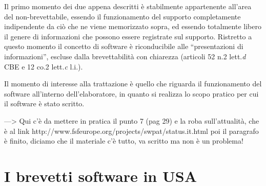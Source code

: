 Il primo momento dei due appena descritti è stabilmente appartenente all'area del non-brevettabile, essendo il funzionamento del supporto completamente indipendente da ciò che ne viene memorizzato sopra, ed essendo totalmente libero il genere di informazioni che possono essere registrate sul supporto. Ristretto a questo momento il concetto di software è riconducibile alle ``presentazioni di informazioni'', escluse dalla brevettabilità con chiarezza (articoli 52 n.2 lett.\textit{d} CBE e 12 co.2 lett.\textit{c} l.i.).

Il momento di interesse alla trattazione è quello che riguarda il funzionamento del software all'interno dell'elaboratore, in quanto si realizza lo scopo pratico per cui il software è stato scritto.

---> Qui c'è da mettere in pratica il punto 7 (pag 29) e la roba sull'attualità, che è al link http://www.fsfeurope.org/projects/swpat/status.it.html poi il paragrafo è finito, diciamo che il materiale c'è tutto, va scritto ma non è un problema!
\section{I brevetti software in USA}
